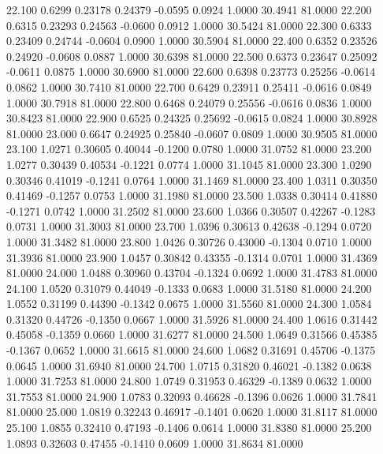   22.100   0.6299   0.23178   0.24379  -0.0595   0.0924   1.0000  30.4941  81.0000
  22.200   0.6315   0.23293   0.24563  -0.0600   0.0912   1.0000  30.5424  81.0000
  22.300   0.6333   0.23409   0.24744  -0.0604   0.0900   1.0000  30.5904  81.0000
  22.400   0.6352   0.23526   0.24920  -0.0608   0.0887   1.0000  30.6398  81.0000
  22.500   0.6373   0.23647   0.25092  -0.0611   0.0875   1.0000  30.6900  81.0000
  22.600   0.6398   0.23773   0.25256  -0.0614   0.0862   1.0000  30.7410  81.0000
  22.700   0.6429   0.23911   0.25411  -0.0616   0.0849   1.0000  30.7918  81.0000
  22.800   0.6468   0.24079   0.25556  -0.0616   0.0836   1.0000  30.8423  81.0000
  22.900   0.6525   0.24325   0.25692  -0.0615   0.0824   1.0000  30.8928  81.0000
  23.000   0.6647   0.24925   0.25840  -0.0607   0.0809   1.0000  30.9505  81.0000
  23.100   1.0271   0.30605   0.40044  -0.1200   0.0780   1.0000  31.0752  81.0000
  23.200   1.0277   0.30439   0.40534  -0.1221   0.0774   1.0000  31.1045  81.0000
  23.300   1.0290   0.30346   0.41019  -0.1241   0.0764   1.0000  31.1469  81.0000
  23.400   1.0311   0.30350   0.41469  -0.1257   0.0753   1.0000  31.1980  81.0000
  23.500   1.0338   0.30414   0.41880  -0.1271   0.0742   1.0000  31.2502  81.0000
  23.600   1.0366   0.30507   0.42267  -0.1283   0.0731   1.0000  31.3003  81.0000
  23.700   1.0396   0.30613   0.42638  -0.1294   0.0720   1.0000  31.3482  81.0000
  23.800   1.0426   0.30726   0.43000  -0.1304   0.0710   1.0000  31.3936  81.0000
  23.900   1.0457   0.30842   0.43355  -0.1314   0.0701   1.0000  31.4369  81.0000
  24.000   1.0488   0.30960   0.43704  -0.1324   0.0692   1.0000  31.4783  81.0000
  24.100   1.0520   0.31079   0.44049  -0.1333   0.0683   1.0000  31.5180  81.0000
  24.200   1.0552   0.31199   0.44390  -0.1342   0.0675   1.0000  31.5560  81.0000
  24.300   1.0584   0.31320   0.44726  -0.1350   0.0667   1.0000  31.5926  81.0000
  24.400   1.0616   0.31442   0.45058  -0.1359   0.0660   1.0000  31.6277  81.0000
  24.500   1.0649   0.31566   0.45385  -0.1367   0.0652   1.0000  31.6615  81.0000
  24.600   1.0682   0.31691   0.45706  -0.1375   0.0645   1.0000  31.6940  81.0000
  24.700   1.0715   0.31820   0.46021  -0.1382   0.0638   1.0000  31.7253  81.0000
  24.800   1.0749   0.31953   0.46329  -0.1389   0.0632   1.0000  31.7553  81.0000
  24.900   1.0783   0.32093   0.46628  -0.1396   0.0626   1.0000  31.7841  81.0000
  25.000   1.0819   0.32243   0.46917  -0.1401   0.0620   1.0000  31.8117  81.0000
  25.100   1.0855   0.32410   0.47193  -0.1406   0.0614   1.0000  31.8380  81.0000
  25.200   1.0893   0.32603   0.47455  -0.1410   0.0609   1.0000  31.8634  81.0000
